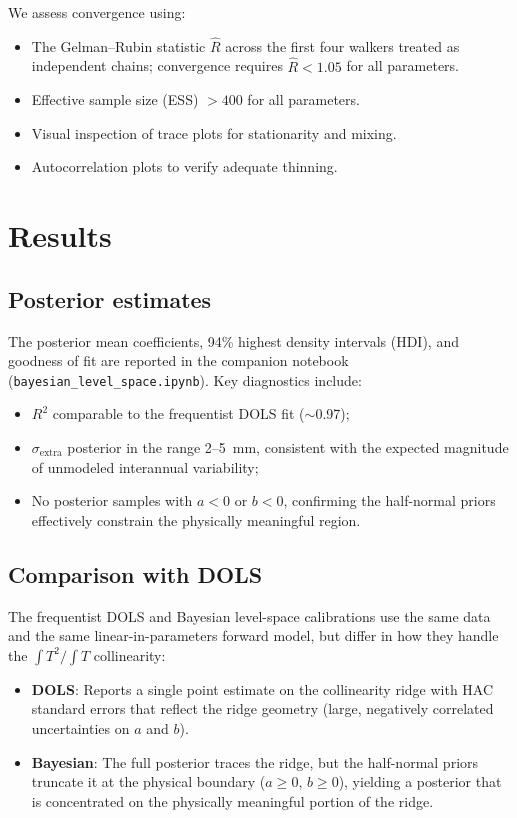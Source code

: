 \documentclass[11pt]{article}
\newcommand{\sigextra}{\sigma_{\text{extra}}}
\begin{document}
We assess convergence using:
\begin{itemize}
  \item The Gelman--Rubin statistic $\hat{R}$ across the first four walkers treated as independent chains; convergence requires $\hat{R} < 1.05$ for all parameters.
  \item Effective sample size (ESS) $> 400$ for all parameters.
  \item Visual inspection of trace plots for stationarity and mixing.
  \item Autocorrelation plots to verify adequate thinning.
\end{itemize}


\section{Results}

\subsection{Posterior estimates}

The posterior mean coefficients, 94\% highest density intervals (HDI), and goodness of fit are reported in the companion notebook (\texttt{bayesian\_level\_space.ipynb}).  Key diagnostics include:

\begin{itemize}
  \item $R^2$ comparable to the frequentist DOLS fit ($\sim$0.97);
  \item $\sigextra$ posterior in the range 2--5~mm, consistent with the expected magnitude of unmodeled interannual variability;
  \item No posterior samples with $a < 0$ or $b < 0$, confirming the half-normal priors effectively constrain the physically meaningful region.
\end{itemize}

\subsection{Comparison with DOLS}

The frequentist DOLS and Bayesian level-space calibrations use the same data and the same linear-in-parameters forward model, but differ in how they handle the $\int T^2 / \int T$ collinearity:

\begin{itemize}
  \item \textbf{DOLS}: Reports a single point estimate on the collinearity ridge with HAC standard errors that reflect the ridge geometry (large, negatively correlated uncertainties on $a$ and $b$).
  \item \textbf{Bayesian}: The full posterior traces the ridge, but the half-normal priors truncate it at the physical boundary ($a \geq 0$, $b \geq 0$), yielding a posterior that is concentrated on the physically meaningful portion of the ridge.
\end{itemize}
\end{document}
